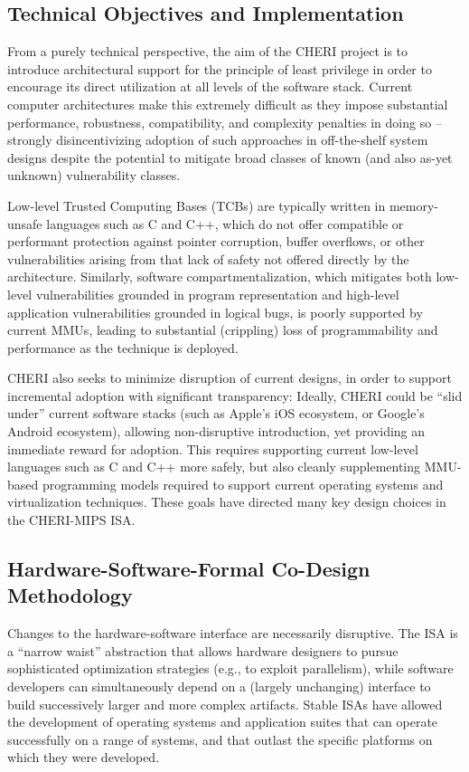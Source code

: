 \subsection{Technical Objectives and Implementation}

From a purely technical perspective, the aim of the CHERI project is to
introduce architectural support for the principle of least privilege in order
to encourage its direct utilization at all levels of the software stack.
Current computer architectures make this extremely difficult as they impose
substantial performance, robustness, compatibility, and complexity penalties
in doing so -- strongly disincentivizing adoption of such approaches in
off-the-shelf system designs despite the potential to mitigate broad classes
of known (and also as-yet unknown) vulnerability classes.

Low-level Trusted Computing Bases (TCBs) are typically written in
memory-unsafe languages such as C and C++, which do not offer compatible or
performant protection against pointer corruption, buffer overflows, or other
vulnerabilities arising from that lack of safety not offered directly by the
architecture.
Similarly, software compartmentalization, which mitigates both low-level
vulnerabilities grounded in program representation and high-level application
vulnerabilities grounded in logical bugs, is poorly supported by current MMUs,
leading to substantial (crippling) loss of programmability and performance as
the technique is deployed.

CHERI also seeks to minimize disruption of current designs, in order to
support incremental adoption with significant
transparency: Ideally, CHERI could be ``slid under'' current software stacks
(such as Apple's iOS ecosystem, or Google's Android ecosystem), allowing
non-disruptive introduction, yet providing an immediate reward for adoption.
This requires supporting current low-level languages such as C and C++ more
safely, but also cleanly supplementing MMU-based programming models required
to support current operating systems and virtualization techniques.
These goals have directed many key design choices in the CHERI-MIPS ISA.

\subsection{Hardware-Software-Formal Co-Design Methodology}

Changes to the hardware-software interface are necessarily disruptive.
The ISA is a ``narrow waist'' abstraction that allows hardware designers to
pursue sophisticated optimization strategies (e.g., to exploit parallelism),
while software developers can simultaneously depend on a (largely unchanging)
interface to build successively larger and more complex artifacts.
Stable ISAs have allowed the development of operating systems and application
suites that can operate successfully on a range of systems, and that outlast
the specific platforms on which they were developed.

